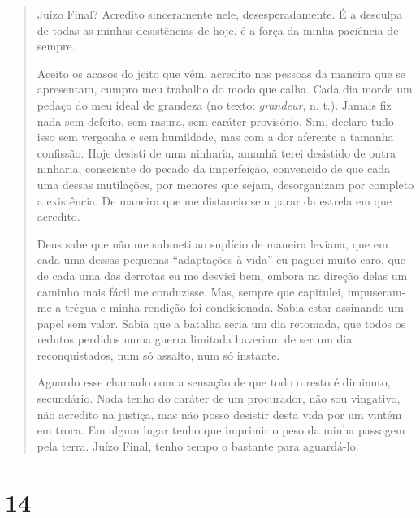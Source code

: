 \begin{quote}
Juízo Final? Acredito sinceramente nele, desesperadamente. É a desculpa
de todas as minhas desistências de hoje, é a força da minha paciência de
sempre.

Aceito os acasos do jeito que vêm, acredito nas pessoas da maneira que
se apresentam, cumpro meu trabalho do modo que calha. Cada dia morde um
pedaço do meu ideal de grandeza (no texto: \emph{grandeur}, n. t.).
Jamais fiz nada sem defeito, sem rasura, sem caráter provisório. Sim,
declaro tudo isso sem vergonha e sem humildade, mas com a dor aferente a
tamanha confissão. Hoje desisti de uma ninharia, amanhã terei desistido
de outra ninharia, consciente do pecado da imperfeição, convencido de
que cada uma dessas mutilações, por menores que sejam, desorganizam por
completo a existência. De maneira que me distancio sem parar da estrela
em que acredito.

Deus sabe que não me submeti ao suplício de maneira leviana, que em cada
uma dessas pequenas ``adaptações à vida'' eu paguei muito caro, que de
cada uma das derrotas eu me desviei bem, embora na direção delas um
caminho mais fácil me conduzisse. Mas, sempre que capitulei,
impuseram-me a trégua e minha rendição foi condicionada. Sabia estar
assinando um papel sem valor. Sabia que a batalha seria um dia retomada,
que todos os redutos perdidos numa guerra limitada haveriam de ser um
dia reconquistados, num só assalto, num só instante.

Aguardo esse chamado com a sensação de que todo o resto é diminuto,
secundário. Nada tenho do caráter de um procurador, não sou vingativo,
não acredito na justiça, mas não posso desistir desta vida por um vintém
em troca. Em algum lugar tenho que imprimir o peso da minha passagem
pela terra. Juízo Final, tenho tempo o bastante para aguardá-lo.
\end{quote}

\section{14}\label{section-13}

